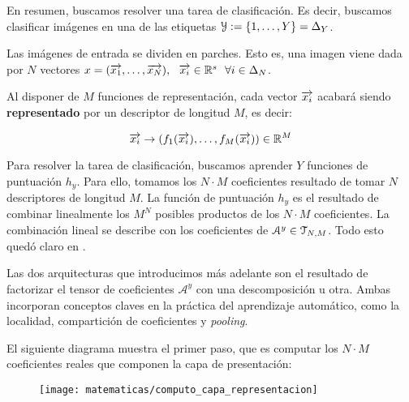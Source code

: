 En resumen, buscamos resolver una tarea de clasificación. Es decir, buscamos clasificar imágenes en una de las etiquetas $\mathcal{Y} := \{1, \ldots, Y\} = \Delta_{Y}$.

Las imágenes de entrada se dividen en parches. Esto es, una imagen viene dada por $N$ vectores $x = (\overrightarrow{x_1}, \ldots, \overrightarrow{x_N}), \ \  \overrightarrow{x_i} \in \mathbb{R}^s \ \  \forall i \in \Delta_{N}$.

Al disponer de $M$ funciones de representación, cada vector $\overrightarrow{x_i}$ acabará siendo \textbf{representado} por un descriptor de longitud $M$, es decir:

\begin{equation}
    \overrightarrow{x_i} \to (f_1(\overrightarrow{x_i}), \ldots, f_M(\overrightarrow{x_i})) \in \mathbb{R}^M
\end{equation}

Para resolver la tarea de clasificación, buscamos aprender $Y$ funciones de puntuación $h_y$. Para ello, tomamos los $N \cdot M$ coeficientes resultado de tomar $N$ descriptores de longitud $M$. La función de puntuación $h_y$ es el resultado de combinar linealmente los $M^N$ posibles productos de los $N \cdot M$ coeficientes. La combinación lineal se describe con los coeficientes de $\mathcal{A}^y \in \mathcal{T}_{N, M}$. Todo esto quedó claro en .

Las dos arquitecturas que introducimos más adelante son el resultado de factorizar el tensor de coeficientes $\mathcal{A}^y$ con una descomposición u otra. Ambas incorporan conceptos claves en la práctica del aprendizaje automático, como la localidad, compartición de coeficientes y \textit{pooling}.

El siguiente diagrama muestra el primer paso, que es computar los $N \cdot M$ coeficientes reales que componen la capa de presentación:

\begin{figure}[H]
    \centering
    \texttt{[image: matematicas/computo\_capa\_representacion]}
    \caption{}
\end{figure}

